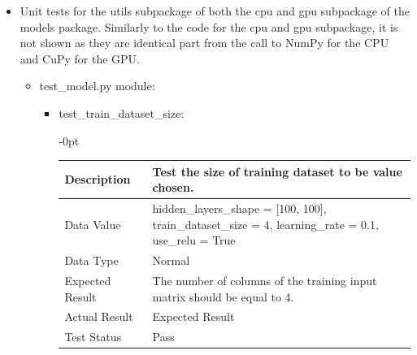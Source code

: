 \documentclass[./project-report/src/latex/project-report.tex]{subfiles}
\begin{document}
\begin{itemize}
    \label{sec:models-utils-unit-tests}
    \item Unit tests for the utils subpackage of both the cpu and gpu subpackage of the models package. Similarly to the code for the cpu and gpu subpackage, it is 
          not shown as they are identical part from the call to NumPy for the CPU and CuPy for the GPU.
        \begin{itemize}
            \item test\_model.py module:
				\begin{itemize}
					\item test\_train\_dataset\_size: \newline
					\begin{adjustwidth}{-\leftmargin}{0pt}
					\begin{tabular}{|p{0.25\linewidth}|p{0.75\linewidth}|}
						\hline
						Description & Test the size of training dataset to be value chosen. \\
						\hline	
						Data Value & hidden\_layers\_shape = [100, 100], \newline
								train\_dataset\_size = 4, \newline
								learning\_rate = 0.1, \newline
								use\_relu = True \\
						\hline
						Data Type & Normal \\
						\hline
						Expected Result & The number of columns of the training input matrix should be equal to 4. \\
						\hline
						Actual Result & Expected Result \\
						\hline
						Test Status & Pass \\
						\hline
					\end{tabular}
					\end{adjustwidth}
					
					\vspace{5mm}
					

\end{itemize}
\end{itemize}
\end{itemize}
\end{document}
